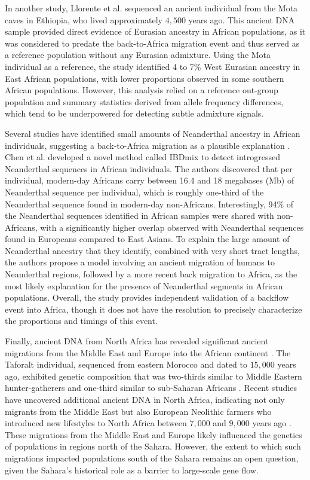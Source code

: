 In another study, Llorente et al. \cite{llorente2015ancient, noauthor_2016-cy} sequenced an ancient individual from the Mota caves in Ethiopia, who lived approximately $4{,}500$ years ago. This ancient DNA sample provided direct evidence of Eurasian ancestry in African populations, as it was considered to predate the back-to-Africa migration event and thus served as a reference population without any Eurasian admixture. Using the Mota individual as a reference, the study identified 4 to 7\% West Eurasian ancestry in East African populations, with lower proportions observed in some southern African populations. However, this analysis relied on a reference out-group population and summary statistics derived from allele frequency differences, which tend to be underpowered for detecting subtle admixture signals.


Several studies have identified small amounts of Neanderthal ancestry in African individuals, suggesting a back-to-Africa migration as a plausible explanation \cite{chen2020identifying,vernot2016excavating}. 
%
Chen et al. \cite{chen2020identifying} developed a novel method called IBDmix to detect introgressed Neanderthal sequences in African individuals. The authors discovered that per individual, modern-day Africans carry between 16.4 and 18 megabases (Mb) of Neanderthal sequence per individual, which is roughly one-third of the Neanderthal sequence found in modern-day non-Africans. 
%
Interestingly, 94\% of the Neanderthal sequences identified in African samples were shared with non-Africans, with a significantly higher overlap observed with Neanderthal sequences found in Europeans compared to East Asians.
%
To explain the large amount of Neanderthal ancestry that they identify, combined with very short tract lengths, the authors propose a model involving an ancient migration of humans to Neanderthal regions, followed by a more recent back migration to Africa, as the most likely explanation for the presence of Neanderthal segments in African populations.
%
Overall, the study provides independent validation of a backflow event into Africa, though it does not have the resolution to precisely characterize the proportions and timings of this event.

Finally, ancient DNA from North Africa has revealed significant ancient migrations from the Middle East and Europe into the African continent \cite{van2018pleistocene, fregel2018ancient, simoes2023northwest}.
%
The Taforalt individual, sequenced from eastern Morocco and dated to $15{,}000$ years ago, exhibited genetic composition that was two-thirds similar to Middle Eastern hunter-gatherers and one-third similar to sub-Saharan Africans \cite{van2018pleistocene}.
%
Recent studies have uncovered additional ancient DNA in North Africa, indicating not only migrants from the Middle East but also European Neolithic farmers who introduced new lifestyles to North Africa between $7{,}000$ and $9{,}000$ years ago \cite{fregel2018ancient, simoes2023northwest}. 
%
These migrations from the Middle East and Europe likely influenced the genetics of populations in regions north of the Sahara. However, the extent to which such migrations impacted populations south of the Sahara remains an open question, given the Sahara’s historical role as a barrier to large-scale gene flow.

